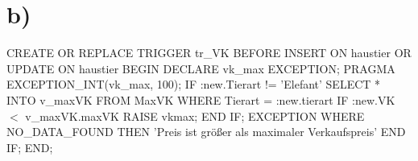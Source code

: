 \documentclass[12pt]{scrreprt}
\begin{document}
\section*{b)}
CREATE OR REPLACE TRIGGER tr\_VK \newline
BEFORE INSERT ON haustier OR UPDATE ON haustier\newline
BEGIN\newline
\hspace*{5mm}DECLARE vk\_max EXCEPTION;\newline
\hspace*{5mm}PRAGMA EXCEPTION\_INT(vk\_max, 100);
\hspace*{5mm}IF :new.Tierart != 'Elefant'\newline
\hspace*{10mm}SELECT * INTO v\_maxVK FROM MaxVK\newline
\hspace*{10mm}WHERE Tierart = :new.tierart\newline
\hspace*{10mm}IF :new.VK $<$ v\_maxVK.maxVK\newline
\hspace*{15mm}RAISE vkmax;\newline
\hspace*{10mm}END IF;\newline
\hspace*{5mm}EXCEPTION WHERE NO\_DATA\_FOUND\newline
\hspace*{10mm}THEN 'Preis ist größer als maximaler Verkaufspreis'\newline
\hspace*{5mm}END IF;\newline
END;
\end{document}
